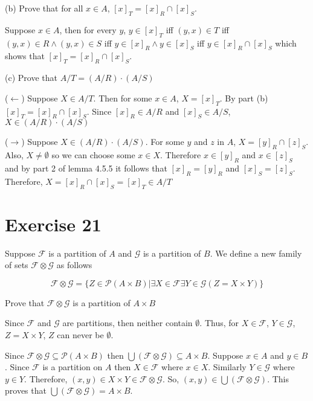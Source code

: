 \documentclass[11pt]{article}
\newcommand{\powerset}[1]{\mathscr{P}(#1)}
\newcommand{\family}[1]{\mathcal{#1}}
\begin{document}
\noindent (b) Prove that for all $x \in A$, $[x]_T = [x]_R \cap [x]_S$.

Suppose $x \in A$, then for every $y$, $y \in [x]_T$ iff 
$(y,x) \in T$ iff
$(y,x) \in R \wedge (y,x) \in S$ iff
$y \in [x]_R \wedge y \in [x]_S$ iff 
$y \in [x]_R \cap [x]_S$ which shows that 
$[x]_T = [x]_R \cap [x]_S$.

\noindent (c) Prove that $A / T = (A/R) \cdot (A/S)$

($\leftarrow$) Suppose $X \in A/T$. Then for some $x \in A$, $X = [x]_T$. By 
part (b) $[x]_T = [x]_R \cap [x]_S$. Since $[x]_R \in A/R$ and $[x]_S \in A/S$,
$X \in (A/R) \cdot (A/S)$

($\rightarrow$) Suppose $X \in (A/R) \cdot (A/S)$. For some $y$ and $z$ in $A$,
$X = [y]_R \cap [z]_S$. Also, $X \neq \emptyset$ so we can choose some $x \in X$.
Therefore $x \in [y]_R$ and $x \in [z]_S$ and by part 2 of lemma 4.5.5 it follows 
that $[x]_R = [y]_R$ and $[x]_S = [z]_S$. 
Therefore, $X = [x]_R \cap [x]_S = [x]_T \in A/T$

\section*{Exercise 21}

Suppose $\family{F}$ is a partition of $A$ and $\family{G}$ is a partition of $B$.
We define a new family of sets $\family{F} \otimes \family{G}$ as follows 

$$\family{F} \otimes \family{G} = \{Z \in \powerset{A \times B} | 
\exists X \in \family{F} \exists Y \in \family{G} (Z = X \times Y)\}$$

Prove that $\family{F} \otimes \family{G}$ is a partition of $A \times B$

Since $\family{F}$ and $\family{G}$ are partitions, then neither contain 
$\emptyset$. Thus, for $X \in \family{F}$, $Y \in \family{G}$, $Z = X \times Y$,
$Z$ can never be $\emptyset$.

Since $\family{F} \otimes \family{G} \subseteq \powerset{A \times B}$
then $\bigcup (\family{F} \otimes \family{G}) \subseteq A \times B$.
Suppose $x \in A$ and $y \in B$. Since $\family{F}$ is a partition on $A$ then 
$X \in \family{F}$ where $x \in X$. Similarly $Y \in \family{G}$ where $y \in Y$.
Therefore, $(x,y) \in X \times Y \in \family{F} \otimes \family{G}$. So, 
$(x,y) \in \bigcup (\family{F} \otimes \family{G})$. This proves that 
$\bigcup (\family{F} \otimes \family{G}) = A \times B$.
\end{document}
